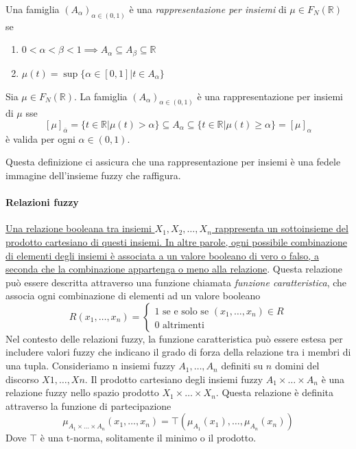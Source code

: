 \begin{definizione}
Una famiglia $(A_\alpha)_{\alpha \in (0,1)}$ è una \textit{rappresentazione per insiemi} di $\mu \in F_N(\mathbb{R})$ se
    \begin{enumerate}
        \item{$0 < \alpha < \beta < 1 \implies A_\alpha \subseteq A_\beta \subseteq \mathbb{R}$}
        \item{$\mu(t) = \sup \{ \alpha \in [0,1] | t \in A_\alpha \} $}
    \end{enumerate} 
\end{definizione}

\begin{definizione}
Sia $\mu \in F_N(\mathbb{R})$. La famiglia $(A_\alpha)_{\alpha \in (0,1)}$ è una rappresentazione per insiemi di $\mu$ sse 
$$[\mu]_{\bar{\alpha}} = \{ t \in \mathbb{R} | \mu(t) > \alpha \} \subseteq A_\alpha \subseteq \{ t \in \mathbb{R} | \mu(t) \geq \alpha \} = [\mu]_\alpha$$
è valida per ogni $\alpha \in (0,1)$.
\end{definizione}
Questa definizione ci assicura che una rappresentazione per insiemi è una fedele immagine dell’insieme fuzzy che raffigura.


\paragraph{Relazioni fuzzy}
\uline{Una relazione booleana tra insiemi $X_1, X_2, \dots, X_n$ rappresenta un sottoinsieme del prodotto cartesiano di questi insiemi. In altre parole, ogni possibile combinazione di elementi degli insiemi è associata a un valore booleano di vero o falso, a seconda che la combinazione appartenga o meno alla relazione}. Questa relazione può essere descritta attraverso una funzione chiamata \textit{funzione caratteristica}, che associa ogni combinazione di elementi ad un valore booleano
$$
R(x_1,\dots,x_n) = \begin{cases}
                        1 \text{ se e solo se } (x_1, \dots, x_n) \in R \\
                        0 \text{ altrimenti }
                    \end{cases}
$$
Nel contesto delle relazioni fuzzy, la funzione caratteristica può essere estesa per includere valori fuzzy che indicano il grado di forza della relazione tra i membri di una tupla. Consideriamo n insiemi fuzzy $A_1, \dots, A_n$ definiti su $n$ domini del discorso $X1, \dots, Xn$. Il prodotto cartesiano degli insiemi fuzzy $A_1 \times \dots \times A_n$ è una relazione fuzzy nello spazio prodotto $X_1 \times \dots \times X_n$. Questa relazione è definita attraverso la funzione di partecipazione
$$\mu_{A_1 \times \dots \times A_n}(x_1, \dots, x_n) = \top(\mu_{A_1}(x_1), \dots,\mu_{A_n}(x_n))$$
Dove $\top$ è una t-norma, solitamente il minimo o il prodotto.

